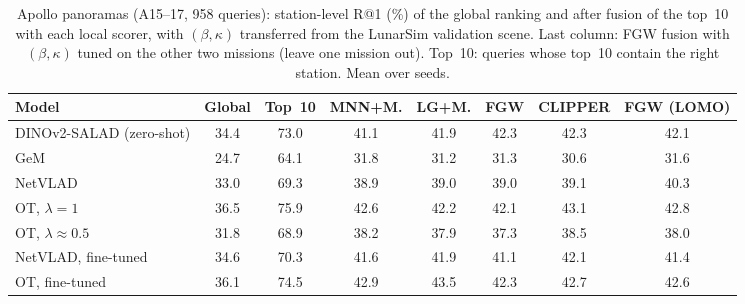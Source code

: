 \begin{table}[t]
\centering
\footnotesize
\setlength{\tabcolsep}{5pt}
\caption{Apollo panoramas (A15--17, 958 queries): station-level R@1 (\%) of the global ranking and after fusion of the top~10 with each local scorer, with $(\beta,\kappa)$ transferred from the LunarSim validation scene. Last column: FGW fusion with $(\beta,\kappa)$ tuned on the other two missions (leave one mission out). Top~10: queries whose top~10 contain the right station. Mean over seeds.}
\label{tab:apollorr}
\begin{tabular}{@{}lccccccc@{}}
\toprule
Model & Global & Top~10 & MNN+M. & LG+M. & FGW & CLIPPER & FGW (LOMO) \\
\midrule
DINOv2-SALAD (zero-shot) & 34.4 & 73.0 & 41.1 & 41.9 & 42.3 & 42.3 & 42.1 \\
GeM & 24.7 & 64.1 & 31.8 & 31.2 & 31.3 & 30.6 & 31.6 \\
NetVLAD & 33.0 & 69.3 & 38.9 & 39.0 & 39.0 & 39.1 & 40.3 \\
OT, $\lambda=1$ & 36.5 & 75.9 & 42.6 & 42.2 & 42.1 & 43.1 & 42.8 \\
OT, $\lambda\approx0.5$ & 31.8 & 68.9 & 38.2 & 37.9 & 37.3 & 38.5 & 38.0 \\
NetVLAD, fine-tuned & 34.6 & 70.3 & 41.6 & 41.9 & 41.1 & 42.1 & 41.4 \\
OT, fine-tuned & 36.1 & 74.5 & 42.9 & 43.5 & 42.3 & 42.7 & 42.6 \\
\bottomrule
\end{tabular}
\end{table}
